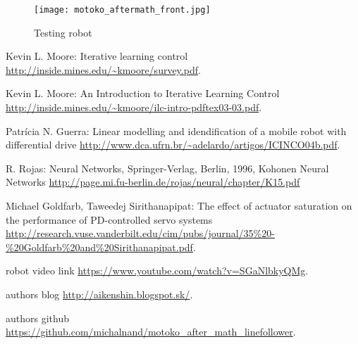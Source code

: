 \documentclass[twoside]{oss-conf-eng}
\begin{document}
\begin{figure}[]
    \centering
    \texttt{[image: motoko\_aftermath\_front.jpg]}
    \caption{Testing robot}
    \label{fig:robot}
\end{figure}


\begin{thebibliography}{99}

Kevin L. Moore: Iterative learning control
\url{http://inside.mines.edu/~kmoore/survey.pdf}.

Kevin L. Moore: An Introduction to Iterative Learning Control
\url{http://inside.mines.edu/~kmoore/ilc-intro-pdftex03-03.pdf}.

Patrícia N. Guerra: Linear modelling and idendification of a mobile robot with
differential drive
\url{http://www.dca.ufrn.br/~adelardo/artigos/ICINCO04b.pdf}.

R. Rojas: Neural Networks, Springer-Verlag, Berlin, 1996, Kohonen Neural Networks
\url{http://page.mi.fu-berlin.de/rojas/neural/chapter/K15.pdf}

Michael Goldfarb, Taweedej Sirithanapipat:
The effect of actuator saturation on the performance of PD-controlled servo systems
\url{http://research.vuse.vanderbilt.edu/cim/pubs/journal/35%20-%20Goldfarb%20and%20Sirithanapipat.pdf}.

robot video link
\url{https://www.youtube.com/watch?v=SGaNlbkyQMg}.

authors blog
\url{http://aikenshin.blogspot.sk/}.

authors github
\url{https://github.com/michalnand/motoko_after_math_linefollower}.

\end{thebibliography}
\end{document}
